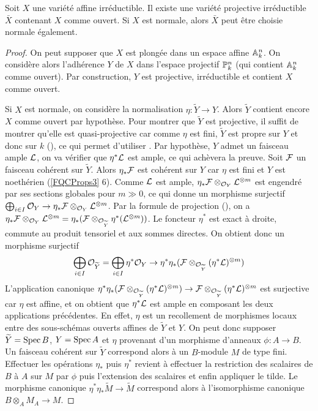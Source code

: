 \begin{lem}\label{CompletionNormal}
Soit $X$ une variété affine irréductible.
Il existe une variété projective irréductible $\bar{X}$ contenant $X$ comme ouvert. Si $X$ est normale, alors $\bar{X}$ peut être choisie normale également.
\end{lem}
\begin{proof}
On peut supposer que $X$ est plongée dans un espace affine $\mathbb{A}^n_k$. On considère alors l'adhérence $Y$ de $X$ dans l'espace projectif $\mathbb{P}^n_k$ (qui contient $\mathbb{A}^n_k$ comme ouvert). Par construction, $Y$ est projective, irréductible et contient $X$ comme ouvert.

Si $X$ est normale, on considère la normalisation $\eta:\widetilde{Y}\rightarrow Y$. Alors $\widetilde{Y}$ contient encore $X$ comme ouvert par hypothèse. Pour montrer que $\widetilde{Y}$ est projective, il suffit de montrer qu'elle est quasi-projective car comme $\eta$ est fini, $\widetilde{Y}$ est propre sur $Y$ et donc sur $k$ (\cite[II.4.8, ex II.4.1]{Hartshorne}), ce qui permet d'utiliser \cite[ex II.4.4]{Hartshorne}. Par hypothèse, $Y$ admet un faisceau ample $\mathcal{L}$, on va vérifier que $\eta^*\mathcal{L}$ est ample, ce qui achèvera la preuve. Soit $\mathcal{F}$ un faisceau cohérent sur $\widetilde{Y}$. Alors $\eta_*\mathcal{F}$ est cohérent sur $Y$ car $\eta$ est fini et $Y$ est noethérien (\ref{FQCProps3} 6). Comme $\mathcal{L}$ est ample, $\eta_*\mathcal{F}\otimes_{\mathcal{O}_Y} \mathcal{L}^{\otimes m}$ est engendré par ses sections globales pour $m\gg 0$, ce qui donne un morphisme surjectif $\bigoplus_{i\in I}\mathcal{O}_Y\rightarrow \eta_*\mathcal{F}\otimes_{\mathcal{O}_Y} \mathcal{L}^{\otimes m}$. Par la formule de projection (\cite[ex II.5.1.d]{Hartshorne}), on a $\eta_*\mathcal{F}\otimes_{\mathcal{O}_Y} \mathcal{L}^{\otimes m}=\eta_*(\mathcal{F}\otimes_{\mathcal{O}_{\widetilde{Y}}}\eta^*(\mathcal{L}^{\otimes m}))$. Le foncteur $\eta^*$ est exact à droite, commute au produit tensoriel et aux sommes directes. On obtient donc un morphisme surjectif 
$$\bigoplus_{i\in I}\mathcal{O}_{\widetilde{Y}}=\bigoplus_{i\in I}\eta^*\mathcal{O}_Y\rightarrow \eta^*\eta_*(\mathcal{F}\otimes_{\mathcal{O}_{\widetilde{Y}}}(\eta^*\mathcal{L})^{\otimes m})$$
L'application canonique $\eta^*\eta_*(\mathcal{F}\otimes_{\mathcal{O}_{\widetilde{Y}}}(\eta^*\mathcal{L})^{\otimes m})\rightarrow \mathcal{F}\otimes_{\mathcal{O}_{\widetilde{Y}}}(\eta^*\mathcal{L})^{\otimes m}$ est surjective car $\eta$ est affine, et on obtient que $\eta^*\mathcal{L}$ est ample en composant les deux applications précédentes. En effet, $\eta$ est un recollement de morphismes locaux entre des sous-schémas ouverts affines de $\widetilde{Y}$ et $Y$. On peut donc supposer $\widetilde{Y}=\operatorname{Spec} B$, $Y=\operatorname{Spec} A$ et $\eta$ provenant d'un morphisme d'anneaux $\phi:A\rightarrow B$. Un faisceau cohérent sur $\widetilde{Y}$ correspond alors à un $B$-module $M$ de type fini. Effectuer les opérations $\eta_*$ puis $\eta^*$ revient à effectuer la restriction des scalaires de $B$ à $A$ sur $M$ par $\phi$ puis l'extension des scalaires et enfin appliquer le tilde. Le morphisme canonique $\eta^*\eta_* \widetilde{M}\rightarrow \widetilde{M}$ correspond alors à l'isomorphisme canonique $B\otimes_A M_A\rightarrow M$.
\end{proof}

